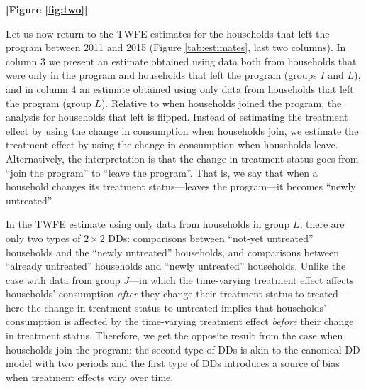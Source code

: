 \documentclass[12pt]{article}
\begin{document}
\centerline{\textbf{[Figure \ref{fig:two}]}}


Let us now return to the TWFE estimates for the households that left the program between 2011 and 2015 (Figure \ref{tab:estimates}, last two columns). In column 3 we present an estimate obtained using data both from households that were only in the program and households that left the program (groups $I$ and  $L$), and in column 4 an estimate obtained using only data from households that left the program (group $L$). Relative to when households joined the program, the analysis for households that left is flipped. Instead of estimating the treatment effect by using the change in consumption when households join, we estimate the treatment effect by using the change in consumption when households leave. Alternatively, the interpretation is that the change in treatment status goes from \enquote{join the program} to \enquote{leave the program}. That is, we say that when a household changes its treatment status---leaves the program---it becomes \enquote{newly untreated}.

In the TWFE estimate using only data from households in group $L$, there are only two types of $2 \times 2$  DDs: comparisons between \enquote{not-yet untreated} households and the \enquote{newly untreated} households, and comparisons between \enquote{already untreated} households and \enquote{newly untreated} households. Unlike the case with data from group $J$---in which the time-varying treatment effect affects households’ consumption \emph{after} they change their treatment status to treated---here the change in treatment status to untreated implies that households’ consumption is affected by the time-varying treatment effect \emph{before} their change in treatment status. Therefore, we get the opposite result from the case when households join the program: the second type of DDs is akin to the canonical DD model with two periods and the first type of DDs introduces a source of bias when treatment effects vary over time.
\end{document}
